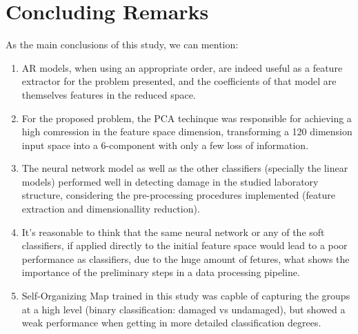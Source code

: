 \documentclass[twocolumn]{article}
\begin{document}
\section{Concluding Remarks}

As the main conclusions of this study, we can mention:

\begin{enumerate}
      \item AR models, when using an appropriate order, are indeed useful as a feature extractor for the problem presented, and the coefficients of that model are themselves features in the reduced space.
      \item For the proposed problem, the PCA techinque was responsible for achieving a high comression in the feature space dimension, transforming a 120 dimension input space into a 6-component with only a few loss of information.
      \item The neural network model as well as the other classifiers (specially the linear models) performed well in detecting damage in the studied laboratory structure, considering the pre-processing procedures implemented (feature extraction and dimensionallity reduction).
      \item It's reasonable to think that the same neural network or any of the soft classifiers, if applied directly to the initial feature space would lead to a poor performance as classifiers, due to the huge amount of fetures, what shows the importance of the preliminary steps in a data processing pipeline.
      \item Self-Organizing Map trained in this study was capble of capturing the groups at a high level (binary classification: damaged vs undamaged), but showed a weak performance when getting in more detailed classification degrees.
\end{enumerate}



\end{document}
